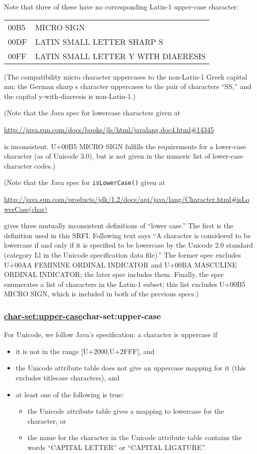 Note that three of these have no corresponding Latin-1 upper-case
character:

\begin{tabular}{ll}
00B5 & MICRO SIGN\tabularnewline
00DF & LATIN SMALL LETTER SHARP S\tabularnewline
00FF & LATIN SMALL LETTER Y WITH DIAERESIS\tabularnewline
\end{tabular}

(The compatibility micro character uppercases to the non-Latin-1 Greek
capital mu; the German sharp s character uppercases to the pair of
characters ``SS,'' and the capital y-with-diaeresis is non-Latin-1.)

(Note that the Java spec for lowercase characters given at

\url{http://java.sun.com/docs/books/jls/html/javalang.doc4.html\#14345}

is inconsistent. U+00B5 MICRO SIGN fulfills the requirements for a
lower-case character (as of Unicode 3.0), but is not given in the
numeric list of lower-case character codes.)

(Note that the Java spec for \texttt{isLowerCase()} given at

\url{http://java.sun.com/products/jdk/1.2/docs/api/java/lang/Character.html\#isLowerCase(char)}

gives three mutually inconsistent definitions of ``lower case.'' The
first is the definition used in this SRFI. Following text says ``A
character is considered to be lowercase if and only if it is specified
to be lowercase by the Unicode 2.0 standard (category Ll in the Unicode
specification data file).'' The former spec excludes U+00AA FEMININE
ORDINAL INDICATOR and U+00BA MASCULINE ORDINAL INDICATOR; the later spec
includes them. Finally, the spec enumerates a list of characters in the
Latin-1 subset; this list excludes U+00B5 MICRO SIGN, which is included
in both of the previous specs.)

\subsubsection{{\href{}{char-set:upper-case}}{char-set:upper-case}}\label{char-setupper-case}

For Unicode, we follow Java's specification: a character is uppercase if

\begin{itemize}
\tightlist
\item
  it is not in the range {[}U+2000,U+2FFF{]}, and
\item
  the Unicode attribute table does not give an uppercase mapping for it
  (this excludes titlecase characters), and
\item
  at least one of the following is true:

  \begin{itemize}
  \tightlist
  \item
    the Unicode attribute table gives a mapping to lowercase for the
    character, or
  \item
    the name for the character in the Unicode attribute table contains
    the words ``CAPITAL LETTER'' or ``CAPITAL LIGATURE''.
  \end{itemize}
\end{itemize}

